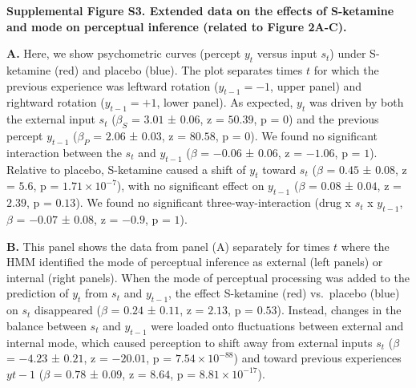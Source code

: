 \documentclass[
]{article}
\begin{document}
\textbf{Supplemental Figure S3. Extended data on the effects of
S-ketamine and mode on perceptual inference (related to Figure 2A-C).}

\textbf{A.} Here, we show psychometric curves (percept \(y_t\) versus
input \(s_t\)) under S-ketamine (red) and placebo (blue). The plot
separates times \(t\) for which the previous experience was leftward
rotation (\(y_{t-1} = -1\), upper panel) and rightward rotation
(\(y_{t-1} = +1\), lower panel). As expected, \(y_t\) was driven by both
the external input \(s_t\) (\(\beta_S\) = \(3.01\) ± \(0.06\), z =
\(50.39\), p = \(0\)) and the previous percept \(y_{t-1}\)
(\(\beta_{P}\) = \(2.06\) ± \(0.03\), z = \(80.58\), p = \(0\)). We
found no significant interaction between the \(s_t\) and \(y_{t-1}\)
(\(\beta\) = \(-0.06\) ± \(0.06\), z = \(-1.06\), p = \(1\)). Relative
to placebo, S-ketamine caused a shift of \(y_t\) toward \(s_t\)
(\(\beta\) = \(0.45\) ± \(0.08\), z = \(5.6\), p =
\(\ensuremath{1.71\times 10^{-7}}\)), with no significant effect on
\(y_{t-1}\) (\(\beta\) = \(0.08\) ± \(0.04\), z = \(2.39\), p =
\(0.13\)). We found no significant three-way-interaction (drug x \(s_t\)
x \(y_{t-1}\), \(\beta\) = \(-0.07\) ± \(0.08\), z = \(-0.9\), p =
\(1\)).

\textbf{B.} This panel shows the data from panel (A) separately for
times \(t\) where the HMM identified the mode of perceptual inference as
external (left panels) or internal (right panels). When the mode of
perceptual processing was added to the prediction of \(y_t\) from
\(s_t\) and \(y_{t-1}\), the effect S-ketamine (red) vs.~placebo (blue)
on \(s_t\) disappeared (\(\beta\) = \(0.24\) ± \(0.11\), z = \(2.13\), p
= \(0.53\)). Instead, changes in the balance between \(s_t\) and
\(y_{t-1}\) were loaded onto fluctuations between external and internal
mode, which caused perception to shift away from external inputs \(s_t\)
(\(\beta\) = \(-4.23\) ± \(0.21\), z = \(-20.01\), p =
\(\ensuremath{7.54\times 10^{-88}}\)) and toward previous experiences
\(y{t-1}\) (\(\beta\) = \(0.78\) ± \(0.09\), z = \(8.64\), p =
\(\ensuremath{8.81\times 10^{-17}}\)).
\end{document}
